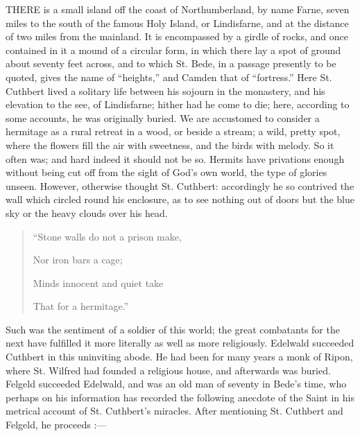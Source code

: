 

THERE
is a small island off the coast of Northumberland, by name Farne,
seven miles to the south of the famous Holy Island, or Lindisfarne,
and at the distance of two miles from the mainland. It is encompassed
by a girdle of rocks, and once contained in it a mound of a circular
form, in which there lay a spot of ground about seventy feet across,
and to which St. Bede, in a passage presently to be quoted, gives the
name of ``heights,'' and Camden that of ``fortress.'' Here St. Cuthbert
lived a solitary life between his sojourn in the monastery, and his
elevation to the see, of Lindisfarne; hither had he come to die; here,
according to some accounts, he was originally buried. We are
accustomed to consider a hermitage as a rural retreat in a wood, or
beside a stream; a wild, pretty spot, where the flowers fill the air
with sweetness, and the birds with melody. So it often was; and hard
indeed it should not be so. Hermits have privations enough without
being cut off from the sight of God's own world, the type of glories
unseen. However, otherwise thought St. Cuthbert: accordingly he
so contrived the wall which circled round his enclosure, as to see
nothing out of doors but the blue sky or the heavy clouds over his
head.

\begin{quote}

``Stone walls do not a prison
make,

Nor iron bars a cage;

Minds innocent and quiet take

That for a hermitage.''

\end{quote}

Such was the sentiment of a soldier of this
world; the great combatants for the next have fulfilled it more
literally as well as more religiously. Edelwald succeeded Cuthbert in
this uninviting abode. He had been for many years a monk of Ripon,
where St. Wilfred had founded a religious house, and afterwards was
buried. Felgeld succeeded Edelwald, and was an old man of seventy in
Bede's time, who perhaps on his information has recorded the following
anecdote of the Saint in his metrical account of St. Cuthbert's
miracles. After mentioning St. Cuthbert and Felgeld, he proceeds :—

